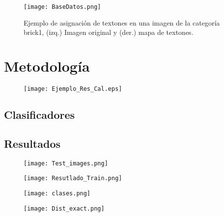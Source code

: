 \documentclass[10pt,twocolumn,letterpaper]{article}
\begin{document}
\begin{figure}[ht]
\centering
\texttt{[image: BaseDatos.png]}
\caption{Ejemplo de asignación de textones en una imagen de la categoría brick1, (izq.) Imagen original y (der.) mapa de textones.}
\end{figure}



\section{Metodología}




\begin{figure}[ht]
\centering

 \texttt{[image: Ejemplo\_Res\_Cal.eps]}

\end{figure}


\subsection{Clasificadores}

\subsection{Resultados}
\begin{figure}[ht]
\centering

 \texttt{[image: Test\_images.png]}

\end{figure}


\begin{figure}[ht]
\centering

 \texttt{[image: Resutlado\_Train.png]}

\end{figure}

\begin{figure}[ht]
\centering

 \texttt{[image: clases.png]}

\end{figure}

\begin{figure}[ht]
\centering

 \texttt{[image: Dist\_exact.png]}

\end{figure}
\end{document}
